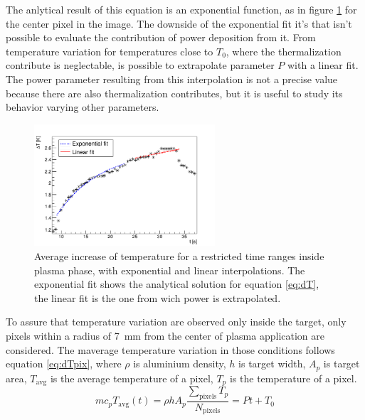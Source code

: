 The anlytical result of this equation is an exponential function, as in figure \ref{fig:dTfit} for the center pixel in the image. The downside of the exponential fit it's that isn't possible to evaluate the contribution of power deposition from it. From temperature variation for temperatures close to $T_{0}$, where the thermalization contribute is neglectable, is possible to extrapolate parameter $P$ with a linear fit. The power parameter resulting from this interpolation is not a precise value because there are also thermalization contributes, but it is useful to study its behavior varying other parameters.
\begin{figure}
 \centering
 \includegraphics[width=0.6\textwidth]{Images/Temperature/f5t4d4_fits.png}
 \caption{Average increase of temperature for a restricted time ranges inside plasma phase, with exponential and linear interpolations. The exponential fit shows the analytical solution for equation \ref{eq:dT}, the linear fit is the one from wich power is extrapolated.}
 \label{fig:dTfit}
\end{figure}

To assure that temperature variation are observed only inside the target, only pixels within a radius of \SI{7}{\milli\meter} from the center of plasma application are considered. The maverage temperature variation in those conditions follows equation \ref{eq:dTpix}, where $\rho$ is aluminium density, $h$ is target width, $A_p$ is target area, $T_{\text{avg}}$ is the average temperature of a pixel, $T_p$ is the temperature of a pixel.
\begin{equation}
 m c_{p} T_{\text{avg}}(t) = \rho h A_{p}\frac{\sum_{\text{pixels}} T_{p}}{N_{\text{pixels}}} = P t + T_{0}
 \label{eq:dTpix}
\end{equation}


